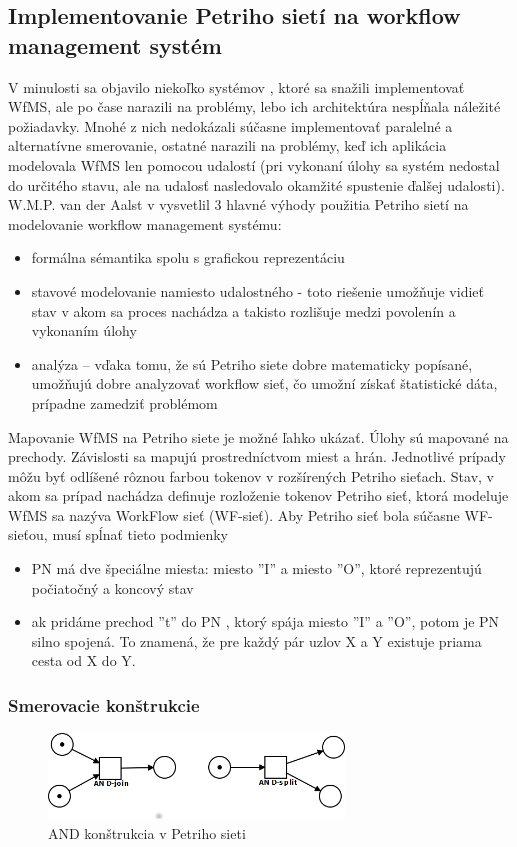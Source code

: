 \subsection{Implementovanie Petriho sietí na workflow management systém}
\label{kap:teoria_petriho_siete_na_workflow}
V minulosti sa objavilo niekoľko systémov , ktoré sa snažili implementovať WfMS, ale po čase narazili na problémy, lebo ich architektúra nespĺňala náležité požiadavky. Mnohé z nich nedokázali súčasne implementovať paralelné a alternatívne smerovanie, ostatné narazili na problémy, keď ich aplikácia modelovala WfMS len pomocou udalostí (pri vykonaní úlohy sa systém nedostal do určitého stavu, ale na udalosť nasledovalo okamžité spustenie ďalšej udalosti).
W.M.P. van der Aalst v \cite{workflow_vyhody}
vysvetlil 3 hlavné výhody použitia Petriho sietí na modelovanie workflow management systému:
\begin{itemize}
	\item formálna sémantika spolu s grafickou reprezentáciu
	\item stavové modelovanie namiesto udalostného - toto riešenie umožňuje vidieť stav v akom sa proces nachádza a takisto rozlišuje medzi povolenín a vykonaním úlohy  %
	\item analýza – vďaka tomu, že sú Petriho siete dobre matematicky popísané, umožňujú dobre analyzovať workflow sieť, čo umožní získať štatistické dáta, prípadne zamedziť problémom
\end{itemize}

Mapovanie WfMS na Petriho siete je možné ľahko ukázať. Úlohy sú mapované na prechody. Závislosti sa mapujú prostredníctvom miest a hrán. Jednotlivé prípady môžu byť odlíšené rôznou farbou tokenov v rozšírených Petriho sieťach. Stav, v akom sa prípad nachádza definuje rozloženie tokenov
Petriho sieť, ktorá modeluje WfMS sa nazýva WorkFlow sieť (WF-sieť). Aby Petriho sieť bola súčasne WF-sieťou, musí spĺnať tieto podmienky
\begin{itemize}
	\item PN má dve špeciálne miesta: miesto ''I'' a miesto ''O'', ktoré reprezentujú počiatočný a koncový stav 
	\item  ak pridáme prechod ''t'' do PN , ktorý spája miesto ''I'' a ''O'', potom je PN silno spojená. To znamená, že pre každý pár uzlov X a Y  existuje priama cesta od X do Y. 
\end{itemize}

\subsubsection{Smerovacie konštrukcie}
\begin{figure}[h]
	\centerline{\includegraphics[width=0.7\textwidth]{images/and}}
	\caption[and]{AND konštrukcia v Petriho sieti}
	\label{obr:cursus}
\end{figure}

